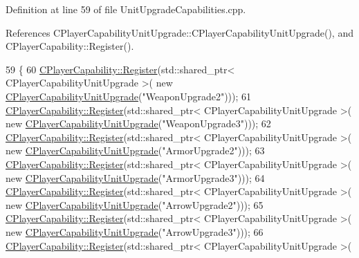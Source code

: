 Definition at line 59 of file Unit\+Upgrade\+Capabilities.\+cpp.



References C\+Player\+Capability\+Unit\+Upgrade\+::\+C\+Player\+Capability\+Unit\+Upgrade(), and C\+Player\+Capability\+::\+Register().


\begin{DoxyCode}
59                                                     \{
60     \hyperlink{classCPlayerCapability_a7e298018dcde2684451add3cfff065f7}{CPlayerCapability::Register}(std::shared\_ptr< CPlayerCapabilityUnitUpgrade >(\textcolor{keyword}{
      new} \hyperlink{classCPlayerCapabilityUnitUpgrade_ac87129322f9f31cc271ee3de33502c56}{CPlayerCapabilityUnitUpgrade}(\textcolor{stringliteral}{"WeaponUpgrade2"})));   
61     \hyperlink{classCPlayerCapability_a7e298018dcde2684451add3cfff065f7}{CPlayerCapability::Register}(std::shared\_ptr< CPlayerCapabilityUnitUpgrade >(\textcolor{keyword}{
      new} \hyperlink{classCPlayerCapabilityUnitUpgrade_ac87129322f9f31cc271ee3de33502c56}{CPlayerCapabilityUnitUpgrade}(\textcolor{stringliteral}{"WeaponUpgrade3"})));
62     \hyperlink{classCPlayerCapability_a7e298018dcde2684451add3cfff065f7}{CPlayerCapability::Register}(std::shared\_ptr< CPlayerCapabilityUnitUpgrade >(\textcolor{keyword}{
      new} \hyperlink{classCPlayerCapabilityUnitUpgrade_ac87129322f9f31cc271ee3de33502c56}{CPlayerCapabilityUnitUpgrade}(\textcolor{stringliteral}{"ArmorUpgrade2"})));   
63     \hyperlink{classCPlayerCapability_a7e298018dcde2684451add3cfff065f7}{CPlayerCapability::Register}(std::shared\_ptr< CPlayerCapabilityUnitUpgrade >(\textcolor{keyword}{
      new} \hyperlink{classCPlayerCapabilityUnitUpgrade_ac87129322f9f31cc271ee3de33502c56}{CPlayerCapabilityUnitUpgrade}(\textcolor{stringliteral}{"ArmorUpgrade3"})));
64     \hyperlink{classCPlayerCapability_a7e298018dcde2684451add3cfff065f7}{CPlayerCapability::Register}(std::shared\_ptr< CPlayerCapabilityUnitUpgrade >(\textcolor{keyword}{
      new} \hyperlink{classCPlayerCapabilityUnitUpgrade_ac87129322f9f31cc271ee3de33502c56}{CPlayerCapabilityUnitUpgrade}(\textcolor{stringliteral}{"ArrowUpgrade2"})));
65     \hyperlink{classCPlayerCapability_a7e298018dcde2684451add3cfff065f7}{CPlayerCapability::Register}(std::shared\_ptr< CPlayerCapabilityUnitUpgrade >(\textcolor{keyword}{
      new} \hyperlink{classCPlayerCapabilityUnitUpgrade_ac87129322f9f31cc271ee3de33502c56}{CPlayerCapabilityUnitUpgrade}(\textcolor{stringliteral}{"ArrowUpgrade3"})));
66     \hyperlink{classCPlayerCapability_a7e298018dcde2684451add3cfff065f7}{CPlayerCapability::Register}(std::shared\_ptr< CPlayerCapabilityUnitUpgrade >(\textcolor{keyword}{
}
\end{DoxyCode}
